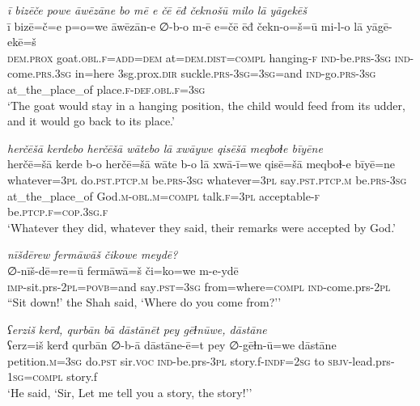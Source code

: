 \ea \label{ZB.54}
\textit{ī bizēče powe āwēzāne bo mē e čē ēđ čeknošū milo lā yāgekēš} \\ 
\gll ī bizē=č=e p=o=we āwēzān-e ∅-b-o m-ē e=čē ēđ čekn-o=š=ū mi-l-o lā yāgē-ekē=š \\ 
 \textsc{dem.prox} goat\textsc{.obl}\textsc{.f}\textsc{=add}\textsc{=dem} at=\textsc{dem.dist}\textsc{=compl} hanging\textsc{-f} \textsc{ind-}be\textsc{.prs}\textsc{-3sg} \textsc{ind-}come\textsc{.prs}\textsc{.3sg} in=here 3sg.prox\textsc{.dir} suckle\textsc{.prs}\textsc{-3sg}\textsc{=3sg}=and \textsc{ind-}go\textsc{.prs}\textsc{-3sg} at\_the\_place\_of place\textsc{.f}\textsc{-def}\textsc{.obl}\textsc{.f}\textsc{=3sg} \\ 
\glt `The goat would stay in a hanging position, the child would feed from its udder, and it would go back to its place.'
\z 
 
\ea \label{ZB.59}
\textit{herčēšā kerdebo herčēšā wātebo lā xwāywe qisēšā meqboɫe bīyēne} \\ 
\gll herčē=šā kerde b-o herčē=šā wāte b-o lā xwā-ī=we qisē=šā meqboɫ-e bīyē=ne \\ 
 whatever\textsc{=3pl} do\textsc{.pst}\textsc{.ptcp}\textsc{.m} be\textsc{.prs}\textsc{-3sg} whatever\textsc{=3pl} say\textsc{.pst}\textsc{.ptcp}\textsc{.m} be\textsc{.prs}\textsc{-3sg} at\_the\_place\_of God\textsc{.m}\textsc{-obl}\textsc{.m}\textsc{=compl} talk\textsc{.f}\textsc{=3pl} acceptable\textsc{-f} be\textsc{.ptcp}\textsc{.f}\textsc{=cop}\textsc{.3sg}\textsc{.f} \\ 
\glt `Whatever they did, whatever they said, their remarks were accepted by God.'
\z 
 
\ea \label{ZQ.4}
\textit{nīšdērew fermāwāš čikowe meydē?} \\ 
\gll ∅-nīš-dē=re=ū fermāwā=š či=ko=we m-e-ydē \\ 
 \textsc{imp-}sit.prs-\textsc{2pl}\textsc{=\textsc{povb}}=and say\textsc{.pst}\textsc{=3sg} from=where\textsc{=compl} \textsc{ind-}come.prs-\textsc{2pl} \\ 
\glt ``Sit down!' the Shah said, ‘Where do you come from?’'
\z 
 
\ea \label{ZQ.7}
\textit{ʕerziš kerđ, qurbān bā dāstānēt pey gēɫnūwe, dāstāne} \\ 
\gll ʕerz=iš kerđ qurbān ∅-b-ā dāstāne-ē=t pey ∅-gēɫn-ū=we dāstāne \\ 
 petition\textsc{.m}\textsc{=3sg} do\textsc{.pst} sir.\textsc{voc} \textsc{ind-}be.prs\textsc{-3pl} story.f\textsc{-indf}\textsc{=\textsc{2sg}} to \textsc{sbjv-}lead.prs\textsc{-\textsc{1sg}}\textsc{=compl} story.f \\ 
\glt `He said, ‘Sir, Let me tell you a story, the story!’'
\z 
 

